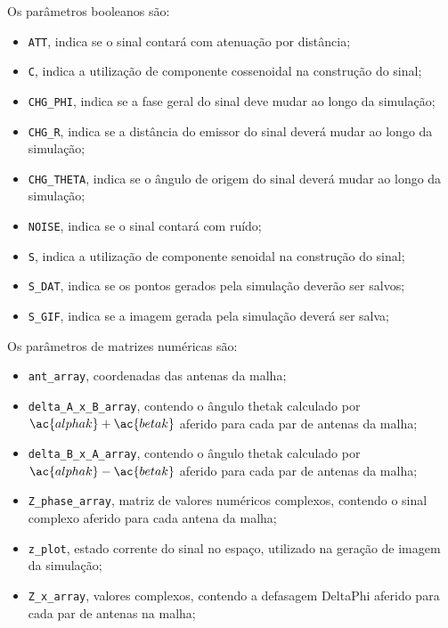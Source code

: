 Os parâmetros booleanos são:
\begin{itemize}
	\item \lstinline|ATT|, indica se o sinal contará com atenuação por distância;
	\item \lstinline|C|, indica a utilização de componente cossenoidal na construção do sinal;
	\item \lstinline|CHG_PHI|, indica se a fase geral do sinal deve mudar ao longo da simulação;
	\item \lstinline|CHG_R|, indica se a distância do emissor do sinal deverá mudar ao longo da simulação;
	\item \lstinline|CHG_THETA|, indica se o ângulo de origem do sinal deverá mudar ao longo da simulação;
	\item \lstinline|NOISE|, indica se o sinal contará com ruído;
	\item \lstinline|S|, indica a utilização de componente senoidal na construção do sinal;
	\item \lstinline|S_DAT|, indica se os pontos gerados pela simulação deverão ser salvos;
	\item \lstinline|S_GIF|, indica se a imagem gerada pela simulação deverá ser salva;
\end{itemize}

Os parâmetros de matrizes numéricas são:
\begin{itemize}
	\item \lstinline|ant_array|, coordenadas das antenas da malha;
	\item \lstinline|delta_A_x_B_array|, contendo o ângulo \ac{thetak} calculado por $\ac{alphak} + \ac{betak}$ aferido para cada par de antenas da malha;
	\item \lstinline|delta_B_x_A_array|, contendo o ângulo \ac{thetak} calculado por $\ac{alphak} - \ac{betak}$ aferido para cada par de antenas da malha;
	\item \lstinline|Z_phase_array|, matriz de valores numéricos complexos, contendo o sinal complexo aferido para cada antena da malha;
	\item \lstinline|z_plot|, estado corrente do sinal no espaço, utilizado na geração de imagem da simulação;
	\item \lstinline|Z_x_array|, valores complexos, contendo a defasagem \ac{DeltaPhi} aferido para cada par de antenas na malha;
\end{itemize}







